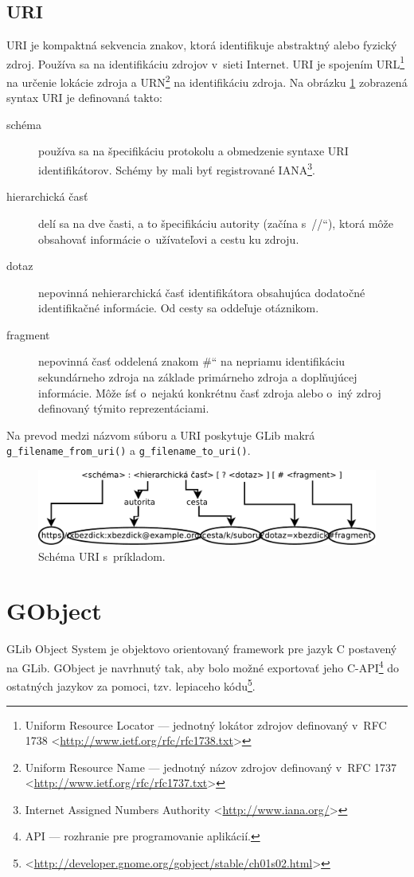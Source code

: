 \documentclass[12pt,oneside,final]{fithesis2}
\newcommand\uv[1]{\quotedblbase #1\textquotedblleft}%
\begin{document}
\subsection{URI} 
URI je kompaktná sekvencia znakov, ktorá identifikuje abstraktný alebo fyzický zdroj. Používa sa na identifikáciu zdrojov v~sieti Internet. URI je spojením URL\footnote{Uniform Resource Locator --- jednotný lokátor zdrojov definovaný v~RFC 1738 <\url{http://www.ietf.org/rfc/rfc1738.txt}>} na určenie lokácie zdroja a URN\footnote{Uniform Resource Name --- jednotný názov zdrojov definovaný v~RFC 1737 <\url{http://www.ietf.org/rfc/rfc1737.txt}>} na identifikáciu zdroja. Na obrázku \ref{obr.URI} zobrazená syntax URI je definovaná takto:
\begin{description}
\item[schéma] používa sa na špecifikáciu protokolu a obmedzenie syntaxe URI identifikátorov. Schémy by mali byť registrované IANA\footnote{Internet Assigned Numbers Authority <\url{http://www.iana.org/}>}.
\item[hierarchická časť] delí sa na dve časti, a to špecifikáciu autority (začína s~\uv{//}), ktorá môže obsahovať informácie o~užívateľovi a cestu ku zdroju.
\item[dotaz] nepovinná nehierarchická časť identifikátora obsahujúca dodatočné identifikačné informácie. Od cesty sa oddeľuje otáznikom.%
\item[fragment] nepovinná časť oddelená znakom \uv{\#} na nepriamu identifikáciu sekundárneho zdroja na základe primárneho zdroja a doplňujúcej informácie. Môže ísť o~nejakú konkrétnu časť zdroja alebo o~iný zdroj definovaný týmito reprezentáciami.
\end{description}
Na prevod medzi názvom súboru a URI poskytuje GLib makrá \texttt{g\_filename\_from\_uri()} a \texttt{g\_filename\_to\_uri()}.

\begin{figure}[hb]
\includegraphics[width=\linewidth]{Diagram1.pdf}
\caption{Schéma URI s~príkladom.}
\label{obr.URI}
\end{figure}

\section{GObject}
GLib Object System je objektovo orientovaný framework pre jazyk C postavený na GLib. GObject je navrhnutý tak, aby bolo možné exportovať jeho C-API\footnote{API --- rozhranie pre programovanie aplikácií.} do ostatných jazykov za pomoci, tzv. lepiaceho kódu\footnote{<\url{http://developer.gnome.org/gobject/stable/ch01s02.html}>}.
\end{document}
